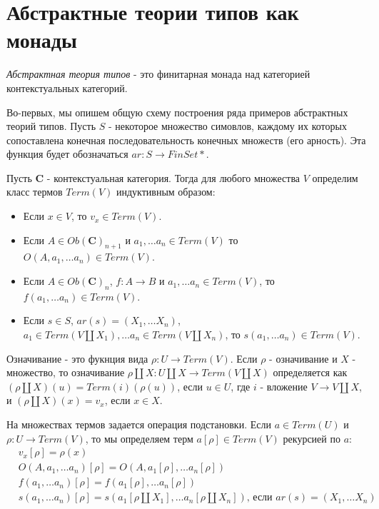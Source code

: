 \documentclass{amsart}
\theoremstyle{definition}
\theoremstyle{remark}
\newcommand{\cat}[1]{\mathbf{#1}}
\renewcommand{\C}{\cat{C}}
\numberwithin{figure}{section}
\begin{document}
\section{Абстрактные теории типов как монады}

\begin{defn}
\emph{Абстрактная теория типов} - это финитарная монада над категорией контекстуальных категорий.
\end{defn}

Во-первых, мы опишем общую схему построения ряда примеров абстрактных теорий типов.
Пусть $S$ - некоторое множество симовлов, каждому их которых сопоставлена конечная последовательность конечных множеств (его арность).
Эта функция будет обозначаться $ar : S \to FinSet*$.

Пусть $\C$ - контекстуальная категория.
Тогда для любого множества $V$ определим класс термов $Term(V)$ индуктивным образом:
\begin{itemize}
\item Если $x \in V$, то $v_x \in Term(V)$.
\item Если $A \in Ob(\C)_{n + 1}$ и $a_1, \ldots a_n \in Term(V)$ то $O(A, a_1, \ldots a_n) \in Term(V)$.
\item Если $A \in Ob(\C)_n$, $f : A \to B$ и $a_1, \ldots a_n \in Term(V)$, то $f(a_1, \ldots a_n) \in Term(V)$.
\item Если $s \in S$, $ar(s) = (X_1, \ldots X_n)$, $a_1 \in Term(V \amalg X_1), \ldots a_n \in Term(V \amalg X_n)$, то $s(a_1, \ldots a_n) \in Term(V)$.
\end{itemize}

Означивание - это фукнция вида $\rho : U \to Term(V)$.
Если $\rho$ - означивание и $X$ - множество, то означивание $\rho \amalg X : U \amalg X \to Term(V \amalg X)$ определяется как $(\rho \amalg X)(u) = Term(i)(\rho(u))$, если $u \in U$, где $i$ - вложение $V \to V \amalg X$, и $(\rho \amalg X)(x) = v_x$, если $x \in X$.

На множествах термов задается операция подстановки.
Если $a \in Term(U)$ и $\rho : U \to Term(V)$, то мы определяем терм $a[\rho] \in Term(V)$ рекурсией по $a$:
\begin{align*}
& v_x[\rho] = \rho(x) \\
& O(A, a_1, \ldots a_n)[\rho] = O(A, a_1[\rho], \ldots a_n[\rho]) \\
& f(a_1, \ldots a_n)[\rho] = f(a_1[\rho], \ldots a_n[\rho]) \\
& s(a_1, \ldots a_n)[\rho] = s(a_1[\rho \amalg X_1], \ldots a_n[\rho \amalg X_n]) \text{, если } ar(s) = (X_1, \ldots X_n)
\end{align*}
\end{document}
